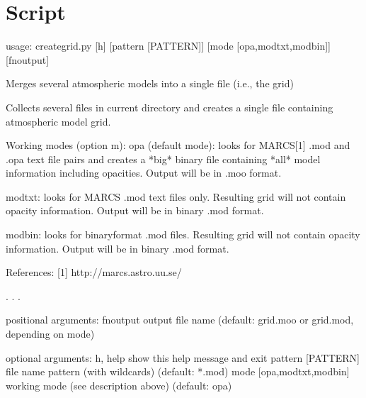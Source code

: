 \documentclass[letterpaper,10pt,english]{sphinxmanual}
\begin{document}
\section{Script }
\label{\detokenize{autoscripts/script-create-grid:script-create-grid-py}}\label{\detokenize{autoscripts/script-create-grid::doc}}
\begin{sphinxVerbatim}[commandchars=\\\{\}]
usage: create\PYGZhy{}grid.py [\PYGZhy{}h] [\PYGZhy{}\PYGZhy{}pattern [PATTERN]]
                      [\PYGZhy{}\PYGZhy{}mode [\PYGZob{}opa,modtxt,modbin\PYGZcb{}]]
                      [fn\PYGZus{}output]

Merges several atmospheric models into a single file (\PYGZus{}i.e.\PYGZus{}, the \PYGZdq{}grid\PYGZdq{})

\PYGZdq{}Collects\PYGZdq{} several files in current directory and creates a single file
containing atmospheric model grid.

Working modes (option \PYGZdq{}\PYGZhy{}m\PYGZdq{}):
 \PYGZdq{}opa\PYGZdq{} (default mode): looks for MARCS[1] \PYGZdq{}.mod\PYGZdq{} and \PYGZdq{}.opa\PYGZdq{} text file pairs and
                       creates a *big* binary file containing *all* model
                       information including opacities.
                       Output will be in \PYGZdq{}.moo\PYGZdq{} format.

 \PYGZdq{}modtxt\PYGZdq{}: looks for MARCS \PYGZdq{}.mod\PYGZdq{} text files only. Resulting grid will not contain
           opacity information.
           Output will be in binary \PYGZdq{}.mod\PYGZdq{} format.

 \PYGZdq{}modbin\PYGZdq{}: looks for binary\PYGZhy{}format \PYGZdq{}.mod\PYGZdq{} files. Resulting grid will not contain
           opacity information.
           Output will be in binary \PYGZdq{}.mod\PYGZdq{} format.

References:
  [1] http://marcs.astro.uu.se/

.
.
.

positional arguments:
  fn\PYGZus{}output             output file name (default: \PYGZdq{}grid.moo\PYGZdq{} or \PYGZdq{}grid.mod\PYGZdq{},
                        depending on mode)

optional arguments:
  \PYGZhy{}h, \PYGZhy{}\PYGZhy{}help            show this help message and exit
  \PYGZhy{}\PYGZhy{}pattern [PATTERN]   file name pattern (with wildcards) (default: *.mod)
  \PYGZhy{}\PYGZhy{}mode [\PYGZob{}opa,modtxt,modbin\PYGZcb{}]
                        working mode (see description above) (default: opa)
\end{sphinxVerbatim}
\end{document}
